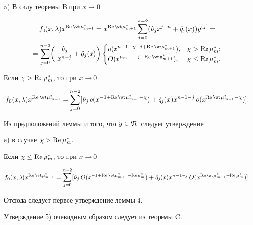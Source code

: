 \begin{pf}


a) В силу теоремы B при $x\to 0$


\begin{multline*}


f_0(x,\lambda)x^{\re\wt\mu^*_{m+1}}=x^{\re\wt\mu^*_{m+1}}


\sum^{n-2}_{j=0}(\Hat\nu_j x^{j-n}+\Hat q_j(x))y^{(j)}=\\


=\sum^{n-2}_{j=0}\biggl(\,\frac{\Hat \nu_j}{x^{n-j}}


+\Hat q_j(x)\biggr)


\begin{cases}


o(x^{n-1-\chi-j+\re\wt\mu^*_{m+1}}),& \chi>\re\mu^*_m;\\


O(x^{\mu_{m+1}-j+\re\wt\mu^*_{m+1}}),& \chi\le\re\mu^*_m.


\end{cases}


\end{multline*}





Если $\chi>\operatorname{Re}\mu^*_m$, то при $x\to 0$


$$


f_0(x,\lambda)x^{\re\wt\mu^*_{m+1}}=\sum^{n-2}_{j=0}


[\Hat \nu_j\,o(x^{-1+\re\wt\mu^*_{m+1}-\chi})+


\Hat q_j(x)x^{n-1-j}\,o(x^{\re\wt\mu^*_{m+1}-\chi})].


$$


Из предположений леммы и того, что $y\in\frak N$, следует утверждение


а) в случае $\chi>\operatorname{Re}\mu^*_m$.





Если $\chi\le\operatorname{Re}\mu^*_m$, то при $x\to 0$


$$


f_0(x,\lambda)x^{\re\wt\mu^*_{m+1}}=\sum^{n-2}_{j=0}


[\Hat \nu_j\,O(x^{-1+\re\wt\mu^*_{m+1}-\re\mu^*_m})+


\Hat q_j(x)x^{n-1-j}\,O(x^{\re\wt\mu^*_{m+1}-\re\mu^*_m})].


$$


Отсюда следует первое утверждение леммы 4.





Утверждение б) очевидным образом следует из теоремы C.


\end{pf}





